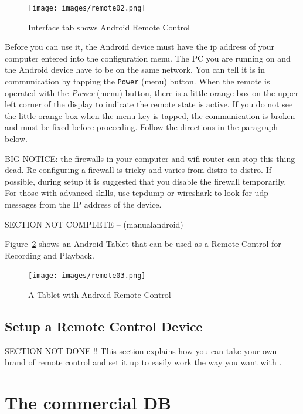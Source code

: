 \begin{figure}[htpb]
    \centering
    \texttt{[image: images/remote02.png]}
    \caption{Interface tab shows Android Remote Control}
    \label{fig:remote02}
\end{figure}

Before you can use it, the Android device must have the ip address of your computer entered into the configuration menu.  The PC you are running \CGG{} on and the Android device have to be on the same network.  You can tell it is in communication by tapping the \texttt{Power} (menu) button. When the remote is operated with the \textit{Power} (menu) button, there is a little orange box on the upper left corner of the display to indicate the remote state is active. If you do not see the little orange box when the menu key is tapped, the communication is broken and must be fixed before proceeding.   Follow the directions in the paragraph below.

BIG NOTICE:  the firewalls in your computer and wifi router can stop this thing dead.  Re-configuring a firewall is tricky and varies from distro to distro.  If possible, during setup it is suggested that you disable the firewall temporarily.  For those with advanced skills, use tcpdump or wireshark to look for udp messages from the IP address of the device.

SECTION NOT COMPLETE – (manualandroid)

Figure~\ref{fig:remote03} shows an Android Tablet that can be used as a Remote Control for \CGG{} Recording and Playback.

\begin{figure}[htpb]
    \centering
    \texttt{[image: images/remote03.png]}
    \caption{A Tablet with Android Remote Control}
    \label{fig:remote03}
\end{figure}

\subsection{Setup a Remote Control Device}%
\label{sub:setup_remote_control_device}

SECTION NOT DONE !! This section explains how you can take your own brand of remote control and set it up to easily work the way you want with \CGG{}.

\section{The commercial DB}%
\label{sec:commercial_db}


